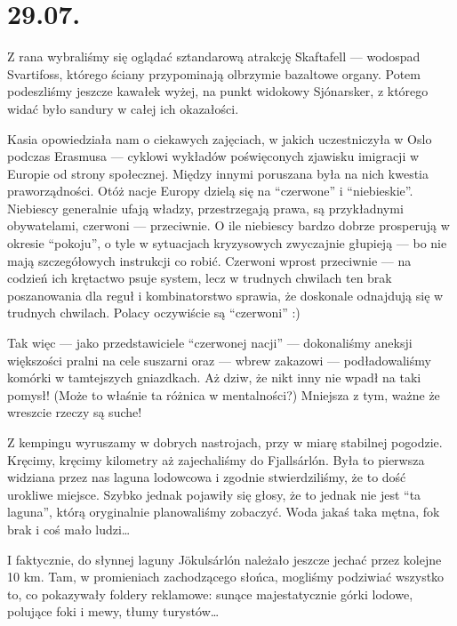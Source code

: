 \chapter*{29.07.}

Z rana wybraliśmy się oglądać sztandarową atrakcję Skaftafell --- wodospad Svartifoss, którego ściany przypominają olbrzymie bazaltowe organy. Potem podeszliśmy jeszcze kawałek wyżej, na punkt widokowy Sjónarsker, z którego widać było sandury w całej ich okazałości.

Kasia opowiedziała nam o ciekawych zajęciach, w jakich uczestniczyła w Oslo podczas Erasmusa --- cyklowi wykładów poświęconych zjawisku imigracji w Europie od strony społecznej. Między innymi poruszana była na nich kwestia praworządności. Otóż nacje Europy dzielą się na “czerwone” i “niebieskie”. Niebiescy generalnie ufają władzy, przestrzegają prawa, są przykładnymi obywatelami, czerwoni --- przeciwnie. O ile niebiescy bardzo dobrze prosperują w okresie “pokoju”, o tyle w sytuacjach kryzysowych zwyczajnie głupieją --- bo nie mają szczegółowych instrukcji co robić. Czerwoni wprost przeciwnie --- na codzień ich krętactwo psuje system, lecz w trudnych chwilach ten brak poszanowania dla reguł i kombinatorstwo sprawia, że doskonale odnajdują się w trudnych chwilach. Polacy oczywiście są “czerwoni” :)

Tak więc --- jako przedstawiciele “czerwonej nacji” --- dokonaliśmy aneksji większości pralni na cele suszarni oraz --- wbrew zakazowi --- podładowaliśmy komórki w tamtejszych gniazdkach. Aż dziw, że nikt inny nie wpadł na taki pomysł! (Może to właśnie ta różnica w mentalności?) Mniejsza z tym, ważne że wreszcie rzeczy są suche!


Z kempingu wyruszamy w dobrych nastrojach, przy w miarę stabilnej pogodzie. Kręcimy, kręcimy kilometry aż zajechaliśmy do Fjallsárlón. Była to pierwsza widziana przez nas laguna lodowcowa i zgodnie stwierdziliśmy, że to dość urokliwe miejsce. Szybko jednak pojawiły się głosy, że to jednak nie jest “ta laguna”, którą oryginalnie planowaliśmy zobaczyć. Woda jakaś taka mętna, fok brak i coś mało ludzi…


I faktycznie, do słynnej laguny Jökulsárlón należało jeszcze jechać przez kolejne 10 km. Tam, w promieniach zachodzącego słońca, mogliśmy podziwiać wszystko to, co pokazywały foldery reklamowe: sunące majestatycznie górki lodowe, polujące foki i mewy, tłumy turystów…

